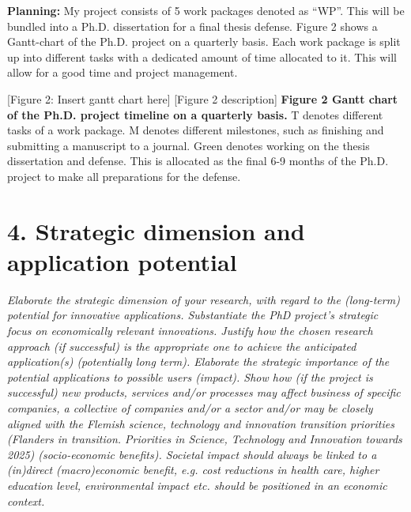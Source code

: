\documentclass[a4paper,11pt]{article}
\begin{document}
\textbf{Planning:}
My project consists of 5 work packages denoted as “WP”. 
This will be bundled into a Ph.D. dissertation for a final thesis defense. Figure 2 shows a Gantt-chart of the Ph.D. project on a quarterly basis.  
Each work package is split up into different tasks with a dedicated amount of time allocated to it. 
This will allow for a good time and project management. 

[Figure 2: Insert gantt chart here]
[Figure 2 description]
\textbf{Figure 2 Gantt chart of the Ph.D. project timeline on a quarterly basis.} T denotes different tasks of a work package. M denotes different milestones, such as finishing and submitting a manuscript to a journal. 
Green denotes working on the thesis dissertation and defense. 
This is allocated as the final 6-9 months of the Ph.D. project to make all preparations for the defense. 


\section{4. Strategic dimension and application potential}
\textit{Elaborate the strategic dimension of your research, with regard to the (long-term) potential for innovative applications. 
Substantiate the PhD project’s strategic focus on economically relevant innovations. Justify how the chosen research approach (if successful) is the appropriate one to achieve the anticipated application(s) (potentially long term).
Elaborate the strategic importance of the potential applications to possible users (impact). Show how (if the project is successful) new products, services and/or processes may affect business of specific companies, a collective of companies and/or a sector and/or may be closely aligned with the Flemish science, technology and innovation transition priorities  (Flanders in transition. Priorities in Science, Technology and Innovation towards 2025) (socio-economic benefits). Societal impact should always be linked to a (in)direct (macro)economic benefit, e.g. cost reductions in health care, higher education level, environmental impact etc. should be positioned in an economic context.}
\end{document}
